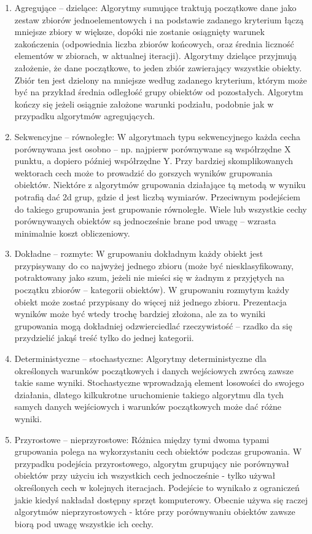 \documentclass{article}
\begin{document}
\begin{enumerate}
	\item Agregujące – dzielące: Algorytmy sumujące traktują początkowe dane jako zestaw zbiorów jednoelementowych i na podstawie zadanego kryterium łączą mniejsze zbiory w większe, dopóki nie zostanie osiągnięty warunek zakończenia (odpowiednia liczba zbiorów końcowych, oraz średnia liczność elementów w zbiorach, w aktualnej iteracji). Algorytmy dzielące przyjmują założenie, że dane początkowe, to jeden zbiór zawierający wszystkie obiekty. Zbiór ten jest dzielony na mniejsze według zadanego kryterium, którym może być na przykład średnia odległość grupy obiektów od pozostałych. Algorytm kończy się jeżeli osiągnie założone warunki podziału, podobnie jak w przypadku algorytmów agregujących.
	\item Sekwencyjne – równoległe: W algorytmach typu sekwencyjnego każda cecha porównywana jest osobno – np. najpierw porównywane są współrzędne X punktu, a dopiero później współrzędne Y. Przy bardziej skomplikowanych wektorach cech może to prowadzić do gorszych wyników grupowania obiektów. Niektóre z algorytmów grupowania działające tą metodą w wyniku potrafią dać 2d grup, gdzie d jest liczbą wymiarów\cite[5. p.~274]{jain_clustering}. Przeciwnym podejściem do takiego grupowania jest grupowanie równoległe. Wiele lub wszystkie cechy porównywanych obiektów są jednocześnie brane pod uwagę – wzrasta minimalnie koszt obliczeniowy.
	\item Dokładne – rozmyte: W grupowaniu dokładnym każdy obiekt jest przypisywany  do co najwyżej jednego zbioru (może być niesklasyfikowany, potraktowany jako szum, jeżeli nie mieści się w żadnym z przyjętych na początku zbiorów – kategorii obiektów). W grupowaniu rozmytym każdy obiekt może zostać przypisany do więcej niż jednego zbioru. Prezentacja wyników może być wtedy trochę bardziej złożona, ale za to wyniki grupowania mogą dokładniej odzwierciedlać rzeczywistość – rzadko da się przydzielić jakąś treść tylko do jednej kategorii.
	\item Deterministyczne – stochastyczne: Algorytmy deterministyczne dla określonych warunków początkowych i danych wejściowych zwrócą zawsze takie same wyniki. Stochastyczne wprowadzają element losowości do swojego działania, dlatego kilkukrotne uruchomienie takiego algorytmu dla tych samych danych wejściowych i warunków początkowych może dać różne wyniki.
	\item Przyrostowe – nieprzyrostowe: Różnica między tymi dwoma typami grupowania polega na wykorzystaniu cech obiektów podczas grupowania. W przypadku podejścia przyrostowego, algorytm grupujący nie porównywał obiektów przy użyciu ich wszystkich cech jednocześnie - tylko używał określonych cech w kolejnych iteracjach. Podejście to wynikało z ograniczeń jakie kiedyś nakładał dostępny sprzęt komputerowy. Obecnie używa się raczej algorytmów nieprzyrostowych - które przy porównywaniu obiektów zawsze biorą pod uwagę wszystkie ich cechy. 
\end{enumerate}
\end{document}
